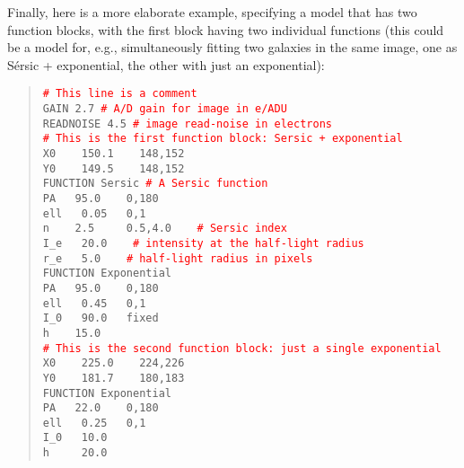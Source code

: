 \documentclass[10pt,a4paper,article]{memoir}
\newcommand{\red}{\textcolor{red}}
\begin{document}
Finally, here is a more elaborate example, specifying a model that has two
function blocks, with the first block having two individual functions (this
could be a model for, e.g., simultaneously fitting two galaxies in the same
image, one as S\'ersic + exponential, the other with just an exponential):

\begin{quote}
  \texttt{\red{\# This line is a comment}}\\
  
  \texttt{GAIN  2.7   \red{\# A/D gain for image in e/ADU}}\\
  \texttt{READNOISE  4.5   \red{\# image read-noise in electrons}}\\
  
  \texttt{\red{\# This is the first function block: Sersic + exponential}}\\
  \texttt{X0 ~~   150.1  ~~ 148,152}\\
  \texttt{Y0 ~~   149.5  ~~ 148,152}\\
  \texttt{FUNCTION   Sersic   \red{\# A Sersic function}}\\
  \texttt{PA  ~  95.0  ~~ 0,180}\\
  \texttt{ell ~   0.05 ~ 0,1}\\
  \texttt{n   ~~   2.5  ~~~ 0.5,4.0 ~~ \red{\# Sersic index}}\\
  \texttt{I\_e ~  20.0 ~~ \red{\# intensity at the half-light radius}}\\
  \texttt{r\_e ~    5.0 ~~ \red{\# half-light radius in pixels}}\\
  \texttt{FUNCTION   Exponential}\\
  \texttt{PA   ~ 95.0  ~~ 0,180}\\
  \texttt{ell  ~  0.45  ~~0,1}\\
  \texttt{I\_0 ~  90.0  ~ fixed}\\
  \texttt{h    ~~ 15.0}\\
  
  \texttt{\red{\# This is the second function block: just a single exponential}}\\
  \texttt{X0 ~~   225.0  ~~ 224,226}\\
  \texttt{Y0 ~~   181.7  ~~ 180,183}\\
  \texttt{FUNCTION   Exponential} \\
  \texttt{PA   ~ 22.0  ~~ 0,180      }\\
  \texttt{ell  ~  0.25 ~ 0,1}\\
  \texttt{I\_0 ~  10.0  }\\
  \texttt{h   ~~~  20.0}\\
\end{quote}
\end{document}
